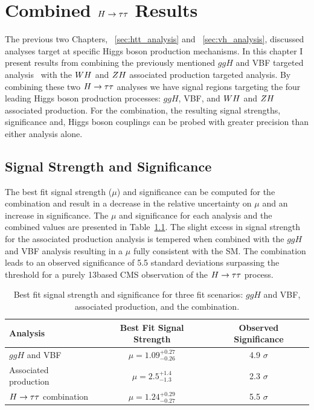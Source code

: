 \chapter{Combined $H\to\tau\tau$ Results}
\label{sec:cmb_results}

The previous two Chapters, ~\ref{sec:htt_analysis} and ~\ref{sec:vh_analysis}, discussed
analyses target at specific Higgs boson production mechanisms. In this chapter
I present results from combining the previously mentioned 
$ggH$ and VBF targeted analysis~\cite{cms_13TeV_htt_jhep_2017}
with the $WH$ and $ZH$ associated production targeted analysis.
By combining these two $H\to\tau\tau$ analyses we have signal regions targeting the four leading Higgs 
boson production processes: $ggH$, VBF, and $WH$ and $ZH$ associated production. 
For the combination, the resulting signal strengths, significance and, Higgs
boson couplings can be probed with greater precision than either analysis alone.

\section{Signal Strength and Significance}
The best fit signal strength ($\mu$) and significance can be computed for the combination and
result in a decrease in the relative uncertainty on $\mu$ and an increase
in significance. The $\mu$ and significance
for each analysis and the combined values are presented in Table~\ref{tab:cmb_mu_and_sig}.
The slight excess in signal strength for the associated production analysis is tempered
when combined with the $ggH$ and VBF analysis resulting in a $\mu$ fully consistent 
with the SM. The combination leads to an 
observed significance of 5.5 standard deviations surpassing the threshold for a
purely 13\TeV based CMS observation of the $H\to\tau\tau$ process. 

\begin{table}[htbp]
\renewcommand{\arraystretch}{1.3}
\centering
\begin{tabular}{lcc}
Analysis         &   Best Fit Signal Strength    &   Observed Significance    \\
\hline
$ggH$ and VBF             &   $\mu = 1.09 ^{+0.27} _{-0.26}$   &  4.9 $\sigma$     \\
Associated production     &   $\mu = 2.5  ^{+1.4}  _{-1.3}$    &  2.3 $\sigma$     \\
$H\to\tau\tau$ combination        &   $\mu = 1.24 ^{+0.29} _{-0.27}$   &  5.5 $\sigma$     \\
\hline
\end{tabular}
\caption{
Best fit signal strength and significance for three fit scenarios: $ggH$ and VBF,
associated production, and the combination.
}
\label{tab:cmb_mu_and_sig}
\end{table}


